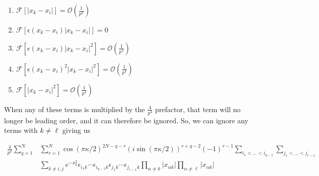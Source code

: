 \documentclass[onecolumn,english,aps,pra]{revtex4}
\begin{document}
\begin{enumerate}
\item $\mathcal{F}[|x_{k} - x_{i}|] = \mathcal{O}(\frac{1}{p^2})$
\item $\mathcal{F}[\epsilon(x_{k} - x_{i})|x_{k} - x_{i}|] = 0$
\item $\mathcal{F}[\epsilon(x_{k} - x_{i})|x_{k} - x_{i}|^2] = \mathcal{O}(\frac{1}{p^3})$
\item $\mathcal{F}[\epsilon(x_{k} - x_{i})^2|x_{k} - x_{i}|^2] = \mathcal{O}(\frac{1}{p^3})$
\item $\mathcal{F}[|x_{k} - x_{i}|^2] = \mathcal{O}(\frac{1}{p^3})$
\end{enumerate}
When any of these terms is multiplied by the $\frac{4}{p^4}$ prefactor, that term will no longer be leading order, and it can therefore be ignored. So, we can ignore any terms with $k \neq \ell$ giving us

\begin{align*}
\frac{4}{p^4}  \sum_{q = 1}^{N} & \sum_{r = 1}^{N} \cos(\pi \kappa /2)^{2N-q-r} (i \sin(\pi \kappa /2))^{r+q-2} (-1)^{r-1} 
\sum_{i_{1} < \ldots < i_{q - 1}} \sum_{j_{1} < \ldots < j_{r - 1}}\\
&\sum_{k \neq i, j} 
e^{-x_{k}^{2}} 
\epsilon_{i_{1}k} \cdots \epsilon_{i_{q-1}k}
\epsilon_{j_{1}k} \cdots \epsilon_{j_{r-1}k}
\prod_{\alpha \neq k} |x_{\alpha k}|
\prod_{\alpha \neq \ell} |x_{\alpha k }|
\end{align*}

	
\end{document}
